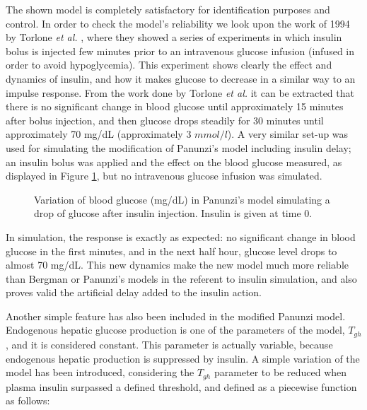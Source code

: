 The shown model is completely satisfactory for identification purposes and control. In order to check the model's reliability we look upon the work of 1994 by Torlone \textit{et al.} \cite{torlone1994}, where they showed a series of experiments in which insulin bolus is injected few minutes prior to an intravenous glucose infusion (infused in order to avoid hypoglycemia). This experiment shows clearly the effect and dynamics of insulin, and how it makes glucose to decrease in a similar way to an impulse response. From the work done by Torlone \textit{et al.} it can be extracted that there is no significant change in blood glucose until approximately 15 minutes after bolus injection, and then glucose drops steadily for 30 minutes until approximately 70 mg/dL (approximately 3 $mmol/l$). A very similar set-up was used for simulating the modification of Panunzi's model including insulin delay; an insulin bolus was applied and the effect on the blood glucose measured, as displayed in Figure \ref{fig:compare5}, but no intravenous glucose infusion was simulated.


\begin{figure}[hbtp]
\centering
{}\caption{Variation of blood glucose (mg/dL) in Panunzi's model simulating a drop of glucose after insulin injection. Insulin is given at time $0$.}
\label{fig:compare5}
\end{figure}

In simulation, the response is exactly as expected: no significant change in blood glucose in the first minutes, and in the next half hour, glucose level drops to almost 70 mg/dL. This new dynamics make the new model much more reliable than Bergman or Panunzi's models in the referent to insulin simulation, and also proves valid the artificial delay added to the insulin action.

Another simple feature has also been included in the modified Panunzi model. Endogenous hepatic glucose production is one of the parameters of the model, $T_{gh}$, and it is considered constant. This parameter is actually variable, because endogenous hepatic production is suppressed by insulin. A simple variation of the model has been introduced, considering the $T_{gh}$ parameter to be reduced when plasma insulin surpassed a defined threshold, and defined as a piecewise function as follows:

